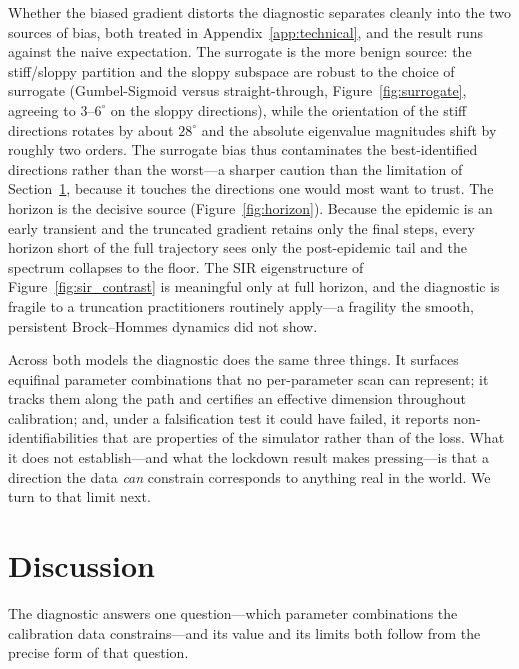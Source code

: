 \documentclass[10pt,twocolumn]{article}
\begin{document}
Whether the biased gradient distorts the diagnostic separates cleanly into the two
sources of bias, both treated in Appendix~\ref{app:technical}, and the result runs
against the naive expectation. The surrogate is the more benign source: the
stiff/sloppy partition and the sloppy subspace are robust to the choice of surrogate
(Gumbel-Sigmoid versus straight-through, Figure~\ref{fig:surrogate}, agreeing to
$3$--$6^\circ$ on the sloppy directions), while the orientation of the stiff
directions rotates by about $28^\circ$ and the absolute eigenvalue magnitudes shift
by roughly two orders. The surrogate bias thus contaminates the best-identified
directions rather than the worst---a sharper caution than the limitation of
Section~\ref{sec:discussion}, because it touches the directions one would most want to
trust. The horizon is the decisive source (Figure~\ref{fig:horizon}). Because the
epidemic is an early transient and the truncated gradient retains only the final
steps, every horizon short of the full trajectory sees only the post-epidemic tail
and the spectrum collapses to the floor. The SIR eigenstructure of
Figure~\ref{fig:sir_contrast} is meaningful only at full horizon, and the diagnostic
is fragile to a truncation practitioners routinely apply---a fragility the smooth,
persistent Brock--Hommes dynamics did not show.

Across both models the diagnostic does the same three things. It surfaces equifinal
parameter combinations that no per-parameter scan can represent; it tracks them along
the path and certifies an effective dimension throughout calibration; and, under a
falsification test it could have failed, it reports non-identifiabilities that are
properties of the simulator rather than of the loss. What it does not establish---and
what the lockdown result makes pressing---is that a direction the data \emph{can}
constrain corresponds to anything real in the world. We turn to that limit next.

\section{Discussion}
\label{sec:discussion}

The diagnostic answers one question---which parameter combinations the calibration
data constrains---and its value and its limits both follow from the precise form of
that question.
\end{document}
